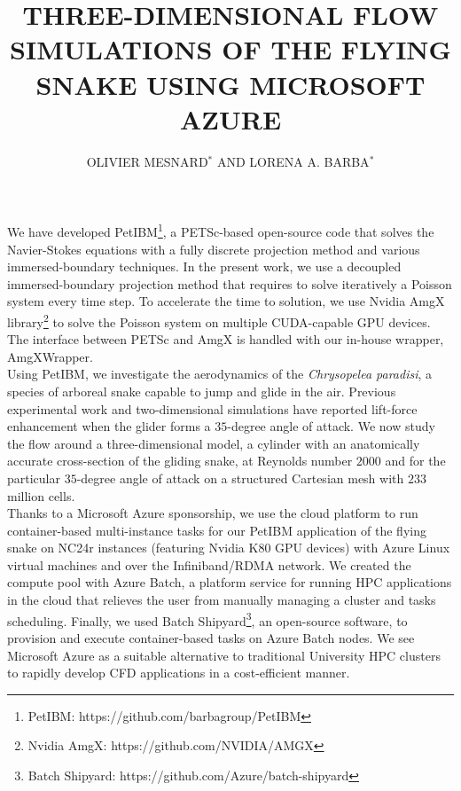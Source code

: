\documentclass{parcfd2018}
\title{THREE-DIMENSIONAL FLOW SIMULATIONS OF THE FLYING SNAKE USING MICROSOFT AZURE}
\author{OLIVIER MESNARD$^{*}$ AND LORENA A. BARBA$^{*}$}
\begin{document}

We have developed PetIBM\footnote{PetIBM: https://github.com/barbagroup/PetIBM}, a PETSc-based open-source code that solves the Navier-Stokes equations with a fully discrete projection method and various immersed-boundary techniques.
In the present work, we use a decoupled immersed-boundary projection method\cite{Li_et_al_2016} that requires to solve iteratively a Poisson system every time step.
To accelerate the time to solution, we use Nvidia AmgX library\footnote{Nvidia AmgX: https://github.com/NVIDIA/AMGX} to solve the Poisson system on multiple CUDA-capable GPU devices.
The interface between PETSc and AmgX is handled with our in-house wrapper, AmgXWrapper\cite{AmgXWrapper}.\\

Using PetIBM, we investigate the aerodynamics of the \textit{Chrysopelea paradisi}, a species of arboreal snake capable to jump and glide in the air.
Previous experimental work \cite{Holden_et_al_2014} and two-dimensional simulations\cite{Krishnan_et_al_2014, Mesnard_Barba_2017} have reported lift-force enhancement when the glider forms a $35$-degree angle of attack.
We now study the flow around a three-dimensional model, a cylinder with an anatomically accurate cross-section of the gliding snake, at Reynolds number $2000$ and for the particular $35$-degree angle of attack on a structured Cartesian mesh with $233$ million cells.\\

Thanks to a Microsoft Azure sponsorship, we use the cloud platform to run container-based multi-instance tasks for our PetIBM application of the flying snake on NC24r instances (featuring Nvidia K80 GPU devices) with Azure Linux virtual machines and over the Infiniband/RDMA network.
We created the compute pool with Azure Batch, a platform service for running HPC applications in the cloud that relieves the user from manually managing a cluster and tasks scheduling.
Finally, we used Batch Shipyard\footnote{Batch Shipyard: https://github.com/Azure/batch-shipyard}, an open-source software, to provision and execute container-based tasks on Azure Batch nodes.
We see Microsoft Azure as a suitable alternative to traditional University HPC clusters to rapidly develop CFD applications in a cost-efficient manner.
\end{document}
